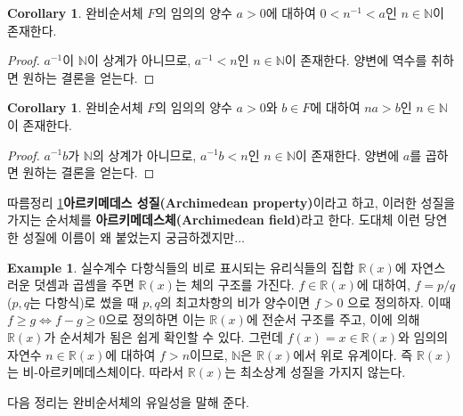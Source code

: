 \documentclass[11pt]{book}
\numberwithin{equation}{chapter}
\def\NN{\mathbb{N}}
\def\RR{\mathbb{R}}
\theoremstyle{definition}
\newtheorem{cor}[thm]{Corollary}
\newtheorem*{ex}{Example}
\begin{document}
    \begin{cor}
        완비순서체 \(F\)의 임의의 양수 \(a > 0\)에 대하여 \(0 < n^{-1} < a\)인 \(n \in \NN\)이 존재한다.
    \end{cor}
    \begin{proof}
        \(a^{-1}\)이 \(\NN\)이 상계가 아니므로, \(a^{-1} < n\)인 \(n \in \NN\)이 존재한다. 양변에 역수를 취하면 원하는 결론을 얻는다.
    \end{proof}
    \begin{cor} \label{cor 1.3.5}
        완비순서체 \(F\)의 임의의 양수 \(a > 0\)와 \(b \in F\)에 대하여 \(na > b\)인 \(n \in \NN\)이 존재한다.
    \end{cor}
    \begin{proof}
        \(a^{-1} b\)가 \(\NN\)의 상계가 아니므로, \(a^{-1}b < n\)인 \(n \in \NN\)이 존재한다. 양변에 \(a\)를 곱하면 원하는 결론을 얻는다.
    \end{proof}

따름정리 \ref{cor 1.3.5}\를 \textbf{아르키메데스 성질(Archimedean property)}이라고 하고, 이러한 성질을 가지는 순서체를 \textbf{아르키메데스체(Archimedean field)}라고 한다. 도대체 이런 당연한 성질에 이름이 왜 붙었는지 궁금하겠지만\(\ldots\)

    \begin{ex}
        실수계수 다항식들의 비로 표시되는 유리식들의 집합 \(\RR(x)\)에 자연스러운 덧셈과 곱셈을 주면 \(\RR(x)\)는 체의 구조를 가진다. \(f \in \RR(x)\)에 대하여, \(f = p / q\) (\(p, q\)는 다항식)로 썼을 때 \(p, q\)의 최고차항의 비가 양수이면 \(f > 0\) 으로 정의하자. 이때 \(f \ge g \iff f - g \ge 0\)으로 정의하면 이는 \(\RR(x)\)에 전순서 구조를 주고, 이에 의해 \(\RR(x)\)가 순서체가 됨은 쉽게 확인할 수 있다. 그런데 \(f(x) = x \in \RR(x)\)와 임의의 자연수 \(n \in \RR(x)\)에 대하여 \(f > n\)이므로, \(\NN\)은 \(\RR(x)\)에서 위로 유계이다. 즉 \(\RR(x)\)는 비-아르키메데스체이다. 따라서 \(\RR(x)\)는 최소상계 성질을 가지지 않는다.
    \end{ex}

다음 정리는 완비순서체의 유일성을 말해 준다.
\end{document}
